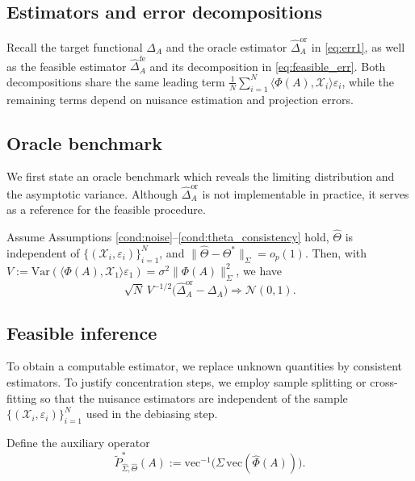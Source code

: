 \documentclass[authoryear,preprint,review,12pt]{elsarticle}
\begin{document}
	
	
	
	
	\subsection{Estimators and error decompositions}\label{sec:infer_setup}
	Recall the target functional $\Delta_A$ and the oracle estimator
	$\widehat{\Delta}_A^{\mathrm{or}}$ in \eqref{eq:err1}, as well as the feasible estimator
	$\widehat{\Delta}_A^{\mathrm{fe}}$ and its decomposition in \eqref{eq:feasible_err}.
	Both decompositions share the same leading term
	$\frac{1}{N}\sum_{i=1}^N \langle \Phi(A),\mathcal{X}_i\rangle\varepsilon_i$,
	while the remaining terms depend on nuisance estimation and projection errors.
	
	\subsection{Oracle benchmark}\label{sec:oracle_infer}
	We first state an oracle benchmark which reveals the limiting distribution and the
	asymptotic variance. Although $\widehat{\Delta}_A^{\mathrm{or}}$ is not implementable in practice,
	it serves as a reference for the feasible procedure.
	
	\begin{thm}
		\label{thm:asymp_normal}
		Assume Assumptions \eqref{cond:noise}--\eqref{cond:theta_consistency} hold,
		$\widehat{\Theta}$ is independent of $\{(\mathcal{X}_i,\varepsilon_i)\}_{i=1}^N$, and
		$\|\widehat{\Theta}-\Theta^\ast\|_\Sigma=o_p(1)$.
		Then, with
		$V:=\mathrm{Var}(\langle \Phi(A),\mathcal{X}_1\rangle\varepsilon_1)
		=\sigma^2\|\Phi(A)\|_\Sigma^2$, we have
		\[
		\sqrt{N}\,V^{-1/2}\big(\widehat{\Delta}_A^{\mathrm{or}} - {\Delta}_A\big)
		\Rightarrow \mathcal{N}(0,1).
		\]
	\end{thm}
	
	\subsection{Feasible inference}\label{sec:feasible_infer}
	To obtain a computable estimator, we replace unknown quantities by consistent estimators.
	To justify concentration steps, we employ sample splitting or cross-fitting so that the nuisance
	estimators are independent of the sample $\{(\mathcal{X}_i,\varepsilon_i)\}_{i=1}^N$
	used in the debiasing step.
	
	Define the auxiliary operator
	\begin{equation}
		\widetilde P_{\widehat{\Sigma},\widehat{\Theta}}^\ast(A)
		:= \mathrm{vec}^{-1}\!\big({\Sigma}\,\mathrm{vec}(\widehat{\Phi}(A))\big).
		\label{eq:p_tilde}
	\end{equation}
	
\end{document}
